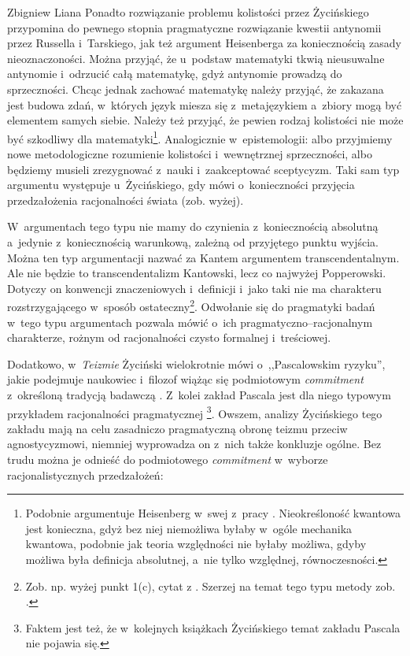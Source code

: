 \begin{artplenv}{Zbigniew Liana}
Ponadto rozwiązanie problemu kolistości przez Życińskiego przypomina do pewnego stopnia pragmatyczne rozwiązanie kwestii antynomii przez Russella i~Tarskiego, jak też argument Heisenberga za koniecznością zasady nieoznaczoności. Można przyjąć, że u~podstaw matematyki tkwią nieusuwalne antynomie i~odrzucić całą matematykę, gdyż antynomie prowadzą do sprzeczności. Chcąc jednak zachować matematykę należy przyjąć, że zakazana jest budowa zdań, w~których język miesza się z~metajęzykiem a~zbiory mogą być elementem samych siebie. Należy też przyjąć, że pewien rodzaj kolistości nie może być szkodliwy dla matematyki\footnote{Podobnie argumentuje Heisenberg w~swej z~pracy
\parencite*[][s.~179n]{heisenberg_uber_1927}. %
 Nieokreśloność kwantowa jest konieczna, gdyż bez niej niemożliwa byłaby w~ogóle mechanika kwantowa, podobnie jak teoria względności nie byłaby możliwa, gdyby możliwa była definicja absolutnej, a~nie tylko względnej, równoczesności.}. Analogicznie w~epistemologii: albo przyjmiemy nowe metodologiczne rozumienie kolistości i~wewnętrznej sprzeczności, albo będziemy musieli zrezygnować z~nauki i~zaakceptować sceptycyzm. Taki sam typ argumentu występuje u~Życińskiego, gdy mówi o~konieczności przyjęcia przedzałożenia racjonalności świata (zob. wyżej).

W~argumentach tego typu nie mamy do czynienia z~koniecznością absolutną a~jedynie z~koniecznością warunkową, zależną od przyjętego punktu wyjścia. Można ten typ argumentacji nazwać za Kantem argumentem transcendentalnym. Ale nie będzie to transcendentalizm Kantowski, lecz co najwyżej Popperowski. Dotyczy on konwencji znaczeniowych i~definicji i~jako taki nie ma charakteru rozstrzygającego w~sposób ostateczny\footnote{Zob. np. wyżej punkt 1(c), cytat z
\parencite[][s.~79]{zycinski_teizm_1985}. %
 Szerzej na temat tego typu metody zob. 
\parencite[][s.~153n]{liana_nauka_2019_liana}.%
}. Odwołanie się do pragmatyki badań w~tego typu argumentach pozwala mówić o~ich pragmatyczno–racjonalnym charakterze, rożnym od racjonalności czysto formalnej i~treściowej.

Dodatkowo, w~\textit{Teizmie} Życiński wielokrotnie mówi o~,,Pascalowskim ryzyku'', jakie podejmuje naukowiec i~filozof wiążąc się podmiotowym \textit{commitment} z~określoną tradycją badawczą
\parencite[][s.~135.86.228.230]{zycinski_teizm_1985}. %
 Z~kolei zakład Pascala jest dla niego typowym przykładem racjonalności pragmatycznej 
\parencite[][s.~207nn]{zycinski_teizm_1985}%
\footnote{Faktem jest też, że w~kolejnych książkach Życińskiego temat zakładu Pascala nie pojawia się.}. Owszem, analizy Życińskiego tego zakładu mają na celu zasadniczo pragmatyczną obronę teizmu przeciw agnostycyzmowi, niemniej wyprowadza on z~nich także konkluzje ogólne. Bez trudu można je odnieść do podmiotowego \textit{commitment} w~wyborze racjonalistycznych przedzałożeń:


\end{artplenv}
